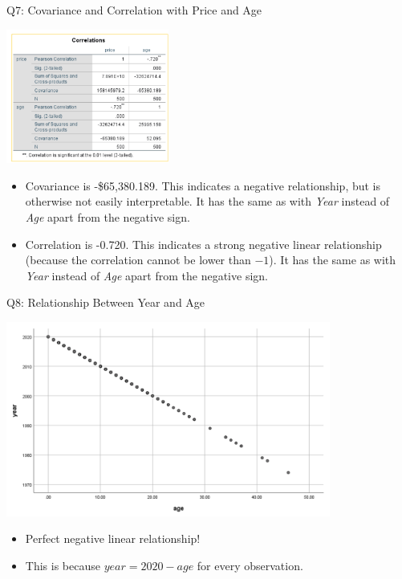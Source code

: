 \documentclass[11pt]{beamer}
\begin{document}
\begin{frame}{Q7: Covariance and Correlation with Price and Age}
  \begin{center}
    \includegraphics[width=0.4\textwidth]{f150-correlation-table-price-age.png}
  \end{center}
  \begin{itemize}
    \item Covariance is -\$65,380.189. This indicates a negative relationship, but is otherwise not easily interpretable. It has the same as with \emph{Year} instead of \emph{Age} apart from the negative sign.
    \item Correlation is -0.720. This indicates a strong negative linear relationship (because the correlation cannot be lower than $-1$). It has the same as with \emph{Year} instead of \emph{Age} apart from the negative sign.
  \end{itemize}
\end{frame}

\begin{frame}{Q8: Relationship Between Year and Age}
  \begin{center}
    \includegraphics[width=0.8\textwidth]{f150-scatter-year-age.png}
  \end{center}
  \begin{itemize}
      \item Perfect negative linear relationship!
      \item This is because $year=2020-age$ for every observation.
  \end{itemize}
\end{frame}
\end{document}
